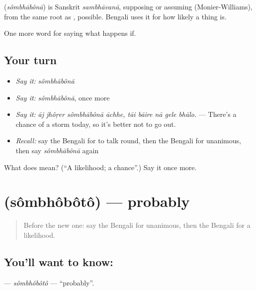 \begin{cousinweb}
\textbf{} (\emph{sômbhābônā}) is Sanskrit \emph{sambhāvanā}, supposing or assuming (Monier-Williams), from the same root as , possible. Bengali uses it for how likely a thing is.
\end{cousinweb}

\begin{grammarlens}[title={What you've built}]
One more word for saying what happens if.
\end{grammarlens}

\subsection*{Your turn}
\begin{itemize}
\raggedright
  \item \emph{Say it:} \emph{sômbhābônā}
  \item \emph{Say it:} \emph{sômbhābônā}, once more
  \item \emph{Say it:} \emph{āj jhôṛer sômbhābônā āchhe, tāi bāire nā gele bhālo.} — There's a chance of a storm today, so it's better not to go out.
  \item \emph{Recall:} say the Bengali for to talk round, then the Bengali for unanimous, then say \emph{sômbhābônā} again
\end{itemize}

\begin{tcolorbox}[breakable,colback=teal!4,colframe=teal!35!black,title={Before you move on}]
What does  mean? (\textquotedblleft{}A likelihood; a chance\textquotedblright{}.) Say it once more.
\end{tcolorbox}
\section[\texorpdfstring{\bn{সম্ভবত} (sômbhôbôtô)}{সম্ভবত (sômbhôbôtô)}]{ (sômbhôbôtô) — probably}

\label{lesson:BN-C366-sombhoboto}



\begin{quote}
Before the new one: say the Bengali for unanimous, then the Bengali for a likelihood.
\end{quote}

\subsection*{You'll want to know: }
\textbf{} — \emph{sômbhôbôtô} — \textquotedblleft{}probably\textquotedblright{}.

